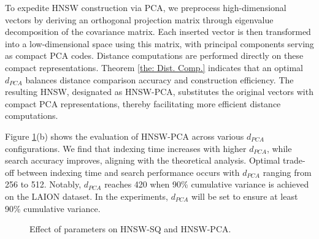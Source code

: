 To expedite HNSW construction via PCA, we preprocess high-dimensional vectors by deriving an orthogonal projection matrix through eigenvalue decomposition of the covariance matrix. Each inserted vector is then transformed into a low-dimensional space using this matrix, with principal components serving as compact PCA codes. Distance computations are performed directly on these compact representations. Theorem \ref{the: Dist. Comp.} indicates that an optimal $d_{PCA}$ balances distance comparison accuracy and construction efficiency. The resulting HNSW, designated as HNSW-PCA, substitutes the original vectors with compact PCA representations, thereby facilitating more efficient distance computations.

Figure \ref{fig: HNSW-SQ and HNSW-PCA laion1m}(b) shows the evaluation of HNSW-PCA across various $d_{PCA}$ configurations. We find that indexing time increases with higher $d_{PCA}$, while search accuracy improves, aligning with the theoretical analysis. Optimal trade-off between indexing time and search performance occurs with $d_{PCA}$ ranging from 256 to 512. Notably, $d_{PCA}$ reaches 420 when 90\% cumulative variance is achieved on the LAION dataset. In the experiments, $d_{PCA}$ will be set to ensure at least 90\% cumulative variance.

\begin{figure}
  \setlength{\abovecaptionskip}{0cm}
  \setlength{\belowcaptionskip}{0cm}
  \centering
  \footnotesize
  \hspace{0.15cm}
  \newline
  \caption{Effect of parameters on HNSW-SQ and HNSW-PCA.}
  \label{fig: HNSW-SQ and HNSW-PCA laion1m}
\end{figure}

\vspace{-0.15cm}
